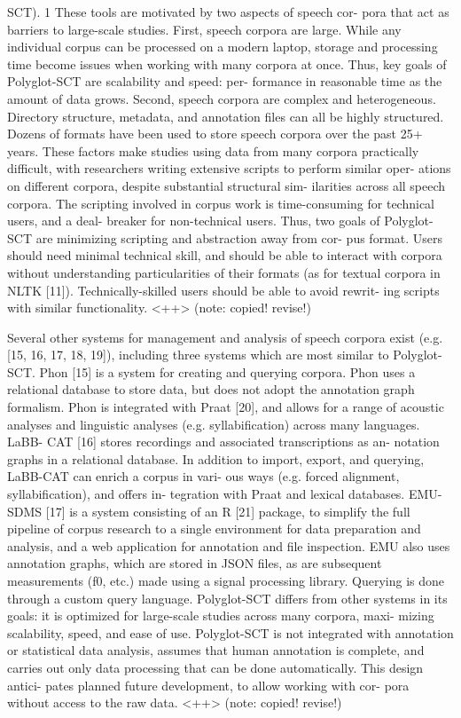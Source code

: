 \documentclass[11pt]{article}
\begin{document}
SCT). 1 These tools are motivated by two aspects of speech cor-
pora that act as barriers to large-scale studies.
First, speech corpora are large. While any individual corpus
can be processed on a modern laptop, storage and processing
time become issues when working with many corpora at once.
Thus, key goals of Polyglot-SCT are scalability and speed: per-
formance in reasonable time as the amount of data grows.
Second, speech corpora are complex and heterogeneous.
Directory structure, metadata, and annotation files can all be
highly structured. Dozens of formats have been used to store
speech corpora over the past 25+ years. These factors make
studies using data from many corpora practically difficult, with
researchers writing extensive scripts to perform similar oper-
ations on different corpora, despite substantial structural sim-
ilarities across all speech corpora. The scripting involved in
corpus work is time-consuming for technical users, and a deal-
breaker for non-technical users. Thus, two goals of Polyglot-
SCT are minimizing scripting and abstraction away from cor-
pus format. Users should need minimal technical skill, and
should be able to interact with corpora without understanding
particularities of their formats (as for textual corpora in NLTK
[11]). Technically-skilled users should be able to avoid rewrit-
ing scripts with similar functionality.
<++> (note: copied! revise!)

Several other systems for management and analysis of speech
corpora exist (e.g. [15, 16, 17, 18, 19]), including three systems
which are most similar to Polyglot-SCT.
Phon [15] is a system for creating and querying corpora.
Phon uses a relational database to store data, but does not adopt
the annotation graph formalism. Phon is integrated with Praat
[20], and allows for a range of acoustic analyses and linguistic
analyses (e.g. syllabification) across many languages. LaBB-
CAT [16] stores recordings and associated transcriptions as an-
notation graphs in a relational database. In addition to import,
export, and querying, LaBB-CAT can enrich a corpus in vari-
ous ways (e.g. forced alignment, syllabification), and offers in-
tegration with Praat and lexical databases. EMU-SDMS [17]
is a system consisting of an R [21] package, to simplify the
full pipeline of corpus research to a single environment for data
preparation and analysis, and a web application for annotation
and file inspection. EMU also uses annotation graphs, which
are stored in JSON files, as are subsequent measurements (f0,
etc.) made using a signal processing library. Querying is done
through a custom query language.
Polyglot-SCT differs from other systems in its goals: it is
optimized for large-scale studies across many corpora, maxi-
mizing scalability, speed, and ease of use. Polyglot-SCT is not
integrated with annotation or statistical data analysis, assumes
that human annotation is complete, and carries out only data
processing that can be done automatically. This design antici-
pates planned future development, to allow working with cor-
pora without access to the raw data.
<++> (note: copied! revise!)
\end{document}
